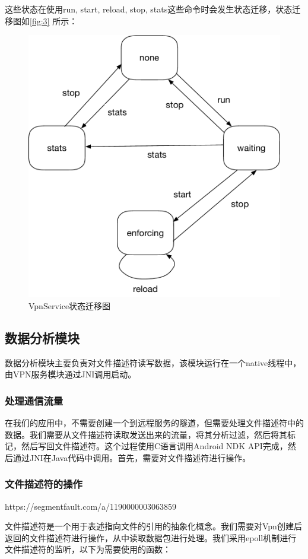 \documentclass[format=final, language=chinese, degree=fyp]{hustthesis}
\begin{document}
这些状态在使用run, start, reload, stop, stats这些命令时会发生状态迁移，状态迁移图如\autoref{fig:3} 所示：

\begin{figure}[h!]
\centering
\includegraphics[width=.6\textwidth]{state_machine}
\caption{VpnService状态迁移图}\label{fig:3}
\end{figure}


\subsection{数据分析模块}
数据分析模块主要负责对文件描述符读写数据，该模块运行在一个native线程中，由VPN服务模块通过JNI调用启动。



\subsubsection{处理通信流量}

在我们的应用中，不需要创建一个到远程服务的隧道，但需要处理文件描述符中的数据。我们需要从文件描述符读取发送出来的流量，将其分析过滤，然后将其标记，然后写回文件描述符。这个过程使用C语言调用Android NDK API完成，然后通过JNI在Java代码中调用。首先，需要对文件描述符进行操作。

\subsubsection{文件描述符的操作}

https://segmentfault.com/a/1190000003063859

文件描述符是一个用于表述指向文件的引用的抽象化概念。我们需要对Vpn创建后返回的文件描述符进行操作，从中读取数据包进行处理。我们采用epoll机制进行文件描述符的监听，以下为需要使用的函数：
\end{document}
